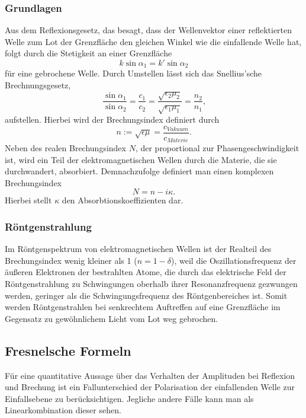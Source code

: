 \subsubsection*{Grundlagen}
Aus dem Reflexionsgesetz, das besagt, dass der Wellenvektor einer reflektierten Welle zum Lot der Grenzfläche den gleichen Winkel wie die einfallende Welle hat,
folgt durch die Stetigkeit an einer Grenzfläche
\begin{equation}
    k \sin \alpha_1 = k' \sin \alpha_2
    \label{eq:Stetigkeit}
\end{equation}
für eine gebrochene Welle.
Durch Umstellen lässt sich das Snellius'sche Brechnungsgesetz,
\begin{equation}
    \frac{\sin \alpha_1}{\sin \alpha_2} = \frac{c_1}{c_2} = \frac{\sqrt{\epsilon_2\mu_2}}{\sqrt{\epsilon_1\mu_1}} = \frac{n_2}{n_1} \text{,}
    \label{eq:Snellius}
\end{equation}
aufstellen. Hierbei wird der Brechungsindex definiert durch
\begin{equation}
    n := \sqrt{\epsilon\mu} = \frac{c_{Vakuum}}{c_{Materie}}.
\end{equation}
Neben des realen Brechungsindex $N$, der proportional zur Phasengeschwindigkeit ist,
wird ein Teil der elektromagnetischen Wellen durch die Materie, die sie durchwandert, absorbiert.
Demnachzufolge definiert man einen komplexen Brechungsindex
\begin{equation}
    N = n - i\kappa \text{.}
    \label{eq:nKomplex}
\end{equation}
Hierbei stellt $\kappa$ den Absorbtionskoeffizienten dar.

\subsubsection*{Röntgenstrahlung}
Im Röntgenspektrum von elektromagnetischen Wellen ist der Realteil des Brechungsindex wenig kleiner als 1 ($n = 1 - \delta$),
weil die Oszillationsfrequenz der äußeren Elektronen der bestrahlten Atome, die durch das elektrische Feld der Röntgenstrahlung zu Schwingungen oberhalb
ihrer Resonanzfrequenz gezwungen werden, geringer als die Schwingungsfrequenz des Röntgenbereiches ist.
Somit werden Röntgenstrahlen bei senkrechtem Auftreffen auf eine Grenzfläche im Gegensatz zu gewöhnlichem Licht vom Lot weg gebrochen.

\subsection{Fresnelsche Formeln}
Für eine quantitative Aussage über das Verhalten der Amplituden bei Reflexion und Brechung ist ein Fallunterschied der Polarisation der einfallenden Welle zur Einfallsebene zu berücksichtigen.
Jegliche andere Fälle kann man als Linearkombination dieser sehen.\cite{physik}
